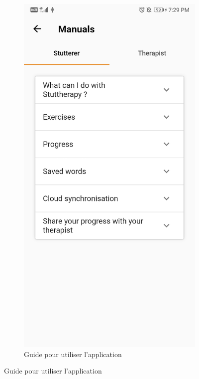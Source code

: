 \begin{appendices}
\begin{landscape}
\begin{figure}[h]
\begin{subfigure}{.25\textwidth}
    \includegraphics[width=.75\linewidth]{content/imgs/screen16.jpg}
    \caption{Guide pour utiliser l'application}
  \end{subfigure}
\end{figure}

\end{landscape}




\end{appendices}
